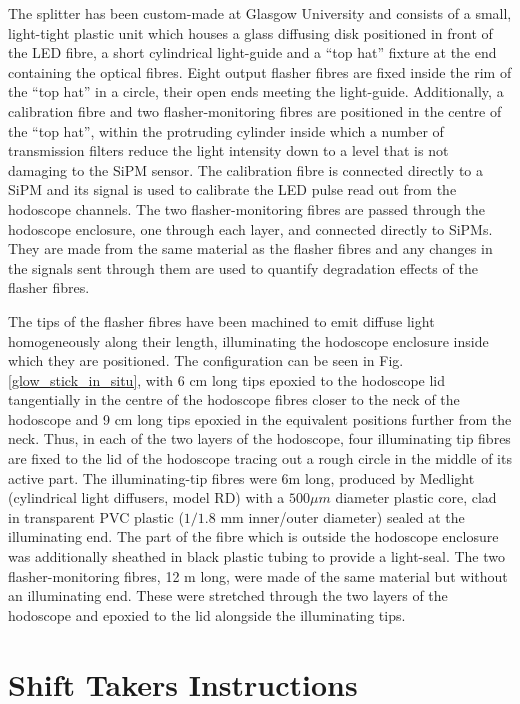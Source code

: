 \documentclass[12pt]{article}
\begin{document}
The splitter has been custom-made at Glasgow University and consists of a small, light-tight plastic unit which houses a glass diffusing disk positioned in front of the LED fibre, a short cylindrical light-guide and a ``top hat'' fixture at the end containing the optical fibres. Eight output flasher fibres are fixed inside the rim of the ``top hat'' in a circle, their open ends meeting the light-guide. Additionally, a calibration fibre and two flasher-monitoring fibres are positioned in the centre of the ``top hat'', within the protruding cylinder inside which a number of transmission filters reduce the light intensity down to a level that is not damaging to the SiPM sensor. The calibration fibre is connected directly to a SiPM and its signal is used to calibrate the LED pulse read out from the hodoscope channels. The two flasher-monitoring fibres are passed through the hodoscope enclosure, one through each layer, and connected directly to SiPMs. They are made from the same material as the flasher fibres and any changes in the signals sent through them are used to quantify degradation effects of the flasher fibres.     

The tips of the flasher fibres have been machined to emit diffuse light homogeneously along their length, illuminating the hodoscope enclosure inside which they are positioned. The configuration can be seen in Fig. \ref{glow_stick_in_situ}, with 6 cm long tips epoxied to the hodoscope lid tangentially in the centre of the hodoscope fibres closer to the neck of the hodoscope and 9 cm long tips epoxied in the equivalent positions further from the neck. Thus, in each of the two layers of the hodoscope, four illuminating tip fibres are fixed to the lid of the hodoscope tracing out a rough circle in the middle of its active part. The illuminating-tip fibres were 6m long, produced by Medlight (cylindrical light diffusers, model RD) with a $500 \mu m$ diameter plastic core, clad in transparent PVC plastic ($1/1.8$ mm inner/outer diameter) sealed at the illuminating end. The part of the fibre which is outside the hodoscope enclosure was additionally sheathed in black plastic tubing to provide a light-seal. The two flasher-monitoring fibres, 12 m long, were made of the same material but without an illuminating end. These were stretched through the two layers of the hodoscope and epoxied to the lid alongside the illuminating tips.

\newpage
\part{Shift Takers Instructions}
\end{document}
